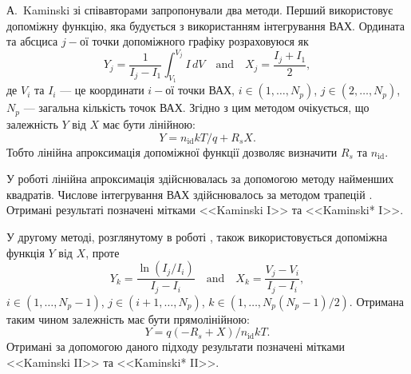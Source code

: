 А.~Kaminski зі співавторами \cite{Kaminski} запропонували два методи.
Перший використовує допоміжну функцію, яка будується з використанням інтегрування ВАХ.
Ордината та абсциса $j-$ої точки допоміжного графіку розраховуюся як
\begin{equation}
\label{eqKam1}
Y_j=\frac{1}{I_j-I_1}\int_{V_1}^{V_j}I\,dV \quad\text{and}\quad X_j=\frac{I_j+I_1}{2},
\end{equation}
де
$V_i$ та $I_i$ --- це координати $i-$ої точки ВАХ,
$i\in(1,\ldots, N_p)$,
$j\in(2,\ldots, N_p)$,
$N_p$ --- загальна кількість точок ВАХ.
Згідно з цим методом очікується, що залежність $Y$ від $X$ має бути лінійною:
\begin{equation}
\label{eqKam1Det}
Y=n_\mathrm{id}kT/q+R_sX.
\end{equation}
Тобто лінійна апроксимація допоміжної функції дозволяє визначити $R_s$ та $n_\mathrm{id}$.

У роботі лінійна апроксимація здійснювалась за допомогою методу найменших квадратів.
Числове інтегрування ВАХ здійснювалось за методом трапецій \cite[с.~98]{KalitkinBook}.
Отримані результаті позначені мітками <<Kaminski I>> та <<Kaminski* I>>.

У другому методі, розглянутому в роботі \cite{Kaminski}, також використовується допоміжна функція $Y$ від $X$, проте
\begin{equation}
\label{eqKam2}
Y_k=\frac{\ln(I_j/I_i)}{I_j-I_i} \quad\text{and}\quad X_k=\frac{V_j-V_i}{I_j-I_i},
\end{equation}
$i\in(1,\ldots, N_p-1)$,
$j\in(i+1,\ldots, N_p)$,
$k\in(1,\ldots, N_p(N_p-1)/2)$.
Отримана таким чином залежність має бути прямолінійною:
\begin{equation}
\label{eqKam2Det}
Y=q(-R_s+X)/n_\mathrm{id}kT.
\end{equation}
Отримані за допомогою даного підходу результати позначені мітками <<Kaminski II>> та <<Kaminski* II>>.

